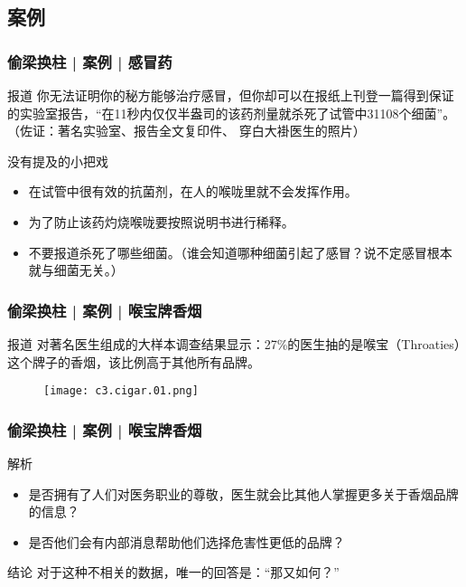 \subsection{案例}
\begin{frame}
  \frametitle{偷梁换柱 | 案例 | 感冒药}
  \begin{block}{报道}
    你无法证明你的秘方能够治疗感冒，但你却可以在报纸上刊登一篇得到保证的实验室报告，“在11秒内仅仅半盎司的该药剂量就杀死了试管中31108个细菌”。（佐证：著名实验室、报告全文复印件、 穿白大褂医生的照片）
  \end{block}
  \pause \pause \pause \pause
  \begin{block}{没有提及的小把戏}
    \begin{itemize}
      \item 在试管中很有效的抗菌剂，在人的喉咙里就不会发挥作用。
      \item 为了防止该药灼烧喉咙要按照说明书进行稀释。
      \item 不要报道杀死了哪些细菌。（谁会知道哪种细菌引起了感冒？说不定感冒根本就与细菌无关。）
    \end{itemize}
  \end{block}
\end{frame}

\begin{frame}
  \frametitle{偷梁换柱 | 案例 | 喉宝牌香烟}
  \begin{block}{报道}
    对著名医生组成的大样本调查结果显示：27\%的医生抽的是喉宝（Throaties）这个牌子的香烟，该比例高于其他所有品牌。
  \end{block}
  \begin{figure}
    \centering
    \texttt{[image: c3.cigar.01.png]}
  \end{figure}
\end{frame}

\begin{frame}
  \frametitle{偷梁换柱 | 案例 | 喉宝牌香烟}
  \begin{block}{解析}
    \begin{itemize}
      \item 是否拥有了人们对医务职业的尊敬，医生就会比其他人掌握更多关于香烟品牌的信息？
      \item 是否他们会有内部消息帮助他们选择危害性更低的品牌？
    \end{itemize}
  \end{block}
  \pause
  \begin{block}{结论}
    对于这种不相关的数据，唯一的回答是：“那又如何？”
  \end{block}
\end{frame}

